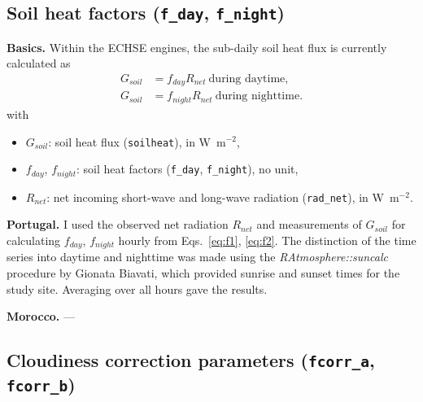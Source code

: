 \documentclass{scrreprt}
\newenvironment{denseitem}{
  \begin{itemize}
    \setlength{\itemsep}{0pt}
    \setlength{\parskip}{0pt}
    \setlength{\parsep}{0pt}
}{
  \end{itemize}
}
\begin{document}
\newpage
\subsection{Soil heat factors (\texttt{f\_day}, \texttt{f\_night})} \label{ssec:parest_rad_f}

\textbf{Basics.}
Within the ECHSE engines, the sub-daily soil heat flux is currently calculated as
\begin{align}
  G_{soil} &= f_{day} R_{net} ~ \text{during daytime}, \label{eq:f1} \\
  G_{soil} &= f_{night} R_{net} ~ \text{during nighttime}. \label{eq:f2}
\end{align}
%
with
\begin{denseitem}
  \item[] $G_{soil}$: soil heat flux (\verb!soilheat!), in W~m$^{-2}$,
  \item[] $f_{day}$, $f_{night}$: soil heat factors (\verb!f_day!, \verb!f_night!), no unit,
  \item[] $R_{net}$: net incoming short-wave and long-wave radiation (\verb!rad_net!), in W~m$^{-2}$.
\end{denseitem}

\noindent
\textbf{Portugal.}
I used the observed net radiation $R_{net}$ and measurements of $G_{soil}$ for calculating $f_{day}$, $f_{night}$ hourly from Eqs.~\eqref{eq:f1}, \eqref{eq:f2}.
The distinction of the time series into daytime and nighttime was made using the \emph{RAtmosphere::suncalc} procedure by Gionata Biavati, which provided sunrise and sunset times for the study site.
Averaging over all hours gave the results.

\noindent
\textbf{Morocco.}
---

\newpage
\subsection{Cloudiness correction parameters (\texttt{fcorr\_a}, \texttt{fcorr\_b})} \label{ssec:parest_rad_fcorr}
\end{document}
